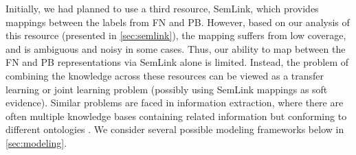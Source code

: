 \documentclass[11pt]{article}
\begin{document}
Initially, we had planned to use a third resource, SemLink, which provides mappings between the labels from FN and PB. However, based on our
analysis of this resource (presented in \cref{sec:semlink}), the mapping suffers from low coverage, and is ambiguous and noisy in some cases. 
Thus, our ability to map between the FN and PB representations via SemLink alone is limited.
Instead, the problem of combining the knowledge across these resources can be viewed as a 
transfer learning or joint learning problem (possibly using SemLink mappings as soft evidence). 
Similar problems are faced in information extraction, where there are often multiple knowledge bases containing related information but conforming to different ontologies \citep[e.g.,][]{riedel-13}.  
We consider several possible modeling frameworks below in \cref{sec:modeling}. 
\end{document}
